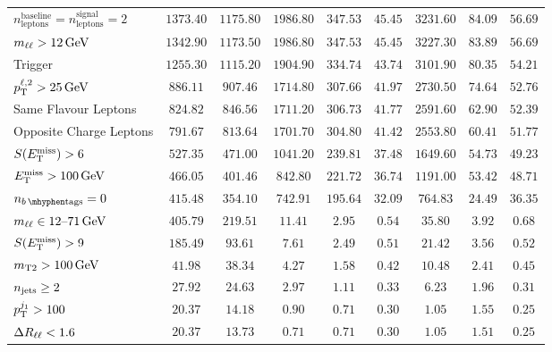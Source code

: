 \begin{sidewaystable}[tp]
{\begin{tabular}{lcccccccc}
$n_\mathrm{leptons}^\mathrm{baseline} = n_\mathrm{leptons}^\mathrm{signal} = 2$     & $1373.40$ & $1175.80$ & $1986.80$ & $347.53$ & $45.45$ & $3231.60$ & $84.09$ & $56.69$ \\
$\mll > 12\,\eV[G]$                                          & $1342.90$ & $1173.50$ & $1986.80$ & $347.53$ & $45.45$ & $3227.30$ & $83.89$ & $56.69$ \\
Trigger                                                   & $1255.30$ & $1115.20$ & $1904.90$ & $334.74$ & $43.74$ & $3101.90$ & $80.35$ & $54.21$ \\
$\pt^{\ell,2} > 25\,\eV[G]$                         & $886.11$ & $907.46$ & $1714.80$ & $307.66$ & $41.97$ & $2730.50$ & $74.64$ & $52.76$ \\
Same Flavour Leptons                                       & $824.82$ & $846.56$ & $1711.20$ & $306.73$ & $41.77$ & $2591.60$ & $62.90$ & $52.39$ \\
Opposite Charge Leptons                                   & $791.67$ & $813.64$ & $1701.70$ & $304.80$ & $41.42$ & $2553.80$ & $60.41$ & $51.77$ \\
$\metsig > 6$                                               & $527.35$ & $471.00$ & $1041.20$ & $239.81$ & $37.48$ & $1649.60$ & $54.73$ & $49.23$ \\
$\met > 100\,\eV[G]$                                           & $466.05$ & $401.46$ & $842.80$ & $221.72$ & $36.74$ & $1191.00$ & $53.42$ & $48.71$ \\
\hline
$\nbtag = 0$                                             & $415.48$ & $354.10$ & $742.91$ & $195.64$ & $32.09$ & $764.83$ & $24.49$ & $36.35$ \\
$\mll \in 12\text{--}71\,\eV[G]$                             & $405.79$ & $219.51$ & $11.41$ & $2.95$ & $0.54$ & $35.80$ & $3.92$ & $0.68$ \\
$\metsig > 9$                                             & $185.49$ & $93.61$ & $7.61$ & $2.49$ & $0.51$ & $21.42$ & $3.56$ & $0.52$ \\
$\mttwo > 100\,\eV[G]$                                       & $41.98$ & $38.34$ & $4.27$ & $1.58$ & $0.42$ & $10.48$ & $2.41$ & $0.45$ \\
$\njet \geq 2$                               & $27.92$ & $24.63$ & $2.97$ & $1.11$ & $0.33$ & $6.23$ & $1.96$ & $0.31$ \\
$\pt^{j_1} > 100$                      & $20.37$ & $14.18$ & $0.90$ & $0.71$ & $0.30$ & $1.05$ & $1.55$ & $0.25$ \\
$\rll < 1.6$                                              & $20.37$ & $13.73$ & $0.71$ & $0.71$ & $0.30$ & $1.05$ & $1.51$ & $0.25$ \\

\end{tabular}}
\end{sidewaystable}
